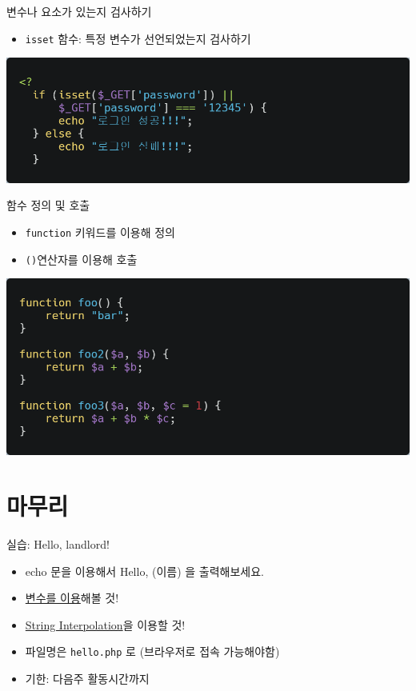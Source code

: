 \documentclass{beamer}
\begin{document}
    \begin{frame}{변수나 요소가 있는지 검사하기}
        \begin{itemize}
            \item \texttt{isset} 함수: 특정 변수가 선언되었는지 검사하기
        \end{itemize}
        \begin{center}
            \includegraphics[width=\textwidth]{Images/php9.png}
        \end{center}
    \end{frame}

    \begin{frame}{함수 정의 및 호출}
        \begin{itemize}
            \item \texttt{function} 키워드를 이용해 정의
            \item \texttt{()}연산자를 이용해 호출
        \end{itemize}
        \begin{center}
            \includegraphics[height=0.4\textheight]{Images/php10.png}
        \end{center}
    \end{frame}

\section{마무리}
    \begin{frame}{실습: Hello, landlord!}
        \begin{itemize}
            \item echo 문을 이용해서 Hello, (이름) 을 출력해보세요.
            \item \underline{변수를 이용}해볼 것!
            \item \underline{String Interpolation}을 이용할 것!
            \item 파일명은 \texttt{hello.php} 로 (브라우저로 접속 가능해야함)
            \item 기한: 다음주 활동시간까지
        \end{itemize}
    \end{frame}
\end{document}
